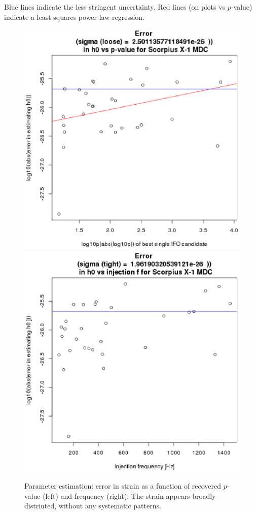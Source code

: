 Blue lines indicate the less stringent uncertainty. Red lines (on plots vs $p$-value) indicate a least squares power law regression.

\begin{figure}
\begin{center}
\includegraphics[width=0.3\paperwidth,height=0.2\paperheight]{Errorh0.eps}
\includegraphics[width=0.3\paperwidth,height=0.2\paperheight]{Errorh0vsF.eps}
\caption{Parameter estimation: error in strain as a function of recovered $p$-value (left) and frequency (right). The strain appears broadly distriuted, without any systematic patterns.
}
\end{center}
\end{figure}


